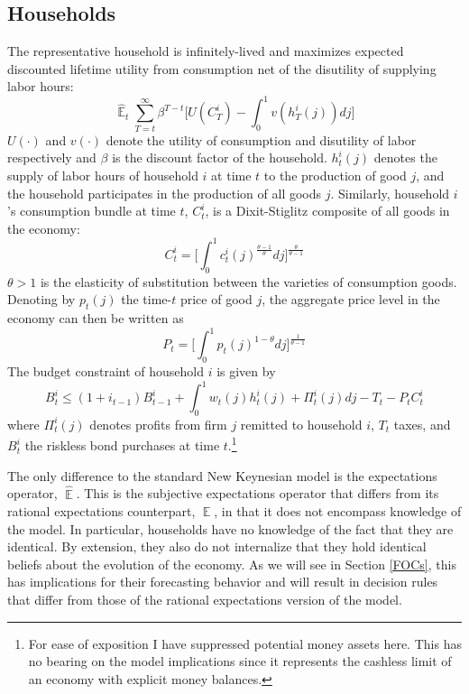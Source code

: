 \documentclass[11pt]{article}
\renewcommand{\[}{\begin{equation}}
\renewcommand{\]}{\end{equation}}
\DeclareMathOperator{\E}{\mathbb{E}}
\begin{document}
\subsection{Households}
The representative household is infinitely-lived and maximizes expected discounted lifetime utility from consumption net of the disutility of supplying labor hours:
\begin{equation}
\hat{\E}_t\sum^{\infty}_{T=t}\beta^{T-t} \bigg[ U(C^i_T) - \int_0^1 v(h^i_T(j)) dj \bigg]
\label{lifetime_U}
\end{equation}
$U(\cdot)$ and $v(\cdot)$ denote the utility of consumption and disutility of labor respectively and $\beta$ is the discount factor of the household. $h^i_t(j)$ denotes the supply of labor hours of household $i$ at time $t$ to the production of good $j$, and the household participates in the production of all goods $j$. Similarly, household $i$'s consumption bundle at time $t$,  $C_t^i$, is a Dixit-Stiglitz composite of all goods in the economy:
\begin{equation}
C^i_t =  \bigg[  \int_0^1 c^i_t(j)^{\frac{\theta-1}{\theta}} dj \bigg]^{\frac{\theta}{\theta-1}}\label{dixit}
\end{equation}
$\theta>1$ is the elasticity of substitution between the varieties of consumption goods. Denoting by $p_t(j)$ the time-$t$ price of good $j$, the aggregate price level in the economy can then be written as
\begin{equation}
P_t =  \bigg[  \int_0^1 p_t(j)^{1-\theta} dj \bigg]^{\frac{1}{\theta-1}}
\label{agg_price}
\end{equation}
The budget constraint of household $i$ is given by
\begin{equation}
 B^i_t \leq (1+i_{t-1})B^i_{t-1} + \int_0^1 w_t(j)h^i_t(j) + \Pi_t^i(j)  dj-T_t -P_tC^i_t
 \label{BC}
\end{equation}
where $\Pi_t^i(j)$ denotes profits from firm $j$ remitted to household $i$, $T_t$ taxes, and $B^i_t$ the riskless bond purchases at time $t$.\footnote{For ease of exposition I have suppressed potential money assets here. This has no bearing on the model implications since it represents the cashless limit of an economy with explicit money balances.}

The only difference to the standard New Keynesian model is the expectations operator, $\hat{\E}$. This is the subjective expectations operator that differs from its rational expectations counterpart, $\E$, in that it does not encompass knowledge of the model. In particular, households have no knowledge of the fact that they are identical. By extension, they also do not internalize that they hold identical beliefs about the evolution of the economy. As we will see in Section \ref{FOCs}, this has implications for their forecasting behavior and will result in decision rules that differ from those of the rational expectations version of the model.
\end{document}
